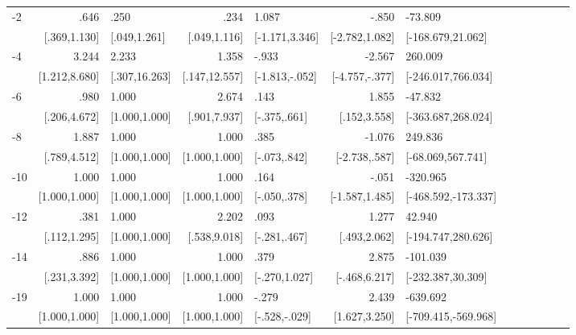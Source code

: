 \begin{table}[h]
\begin{adjustbox}{max width=\linewidth}
\begin{threeparttable}
{\begin{tabular}{l*{6}{D{.}{.}{-1}l}}
-2             &            .646&            .250&            .234&           1.087&           -.850&         -73.809\\
                &    [.369,1.130]&    [.049,1.261]&    [.049,1.116]&  [-1.171,3.346]&  [-2.782,1.082]&[-168.679,21.062]\\
-4             &           3.244&           2.233&           1.358&           -.933&          -2.567&         260.009\\
                &   [1.212,8.680]&   [.307,16.263]&   [.147,12.557]&  [-1.813,-.052]&  [-4.757,-.377]&[-246.017,766.034]\\
-6             &            .980&           1.000&           2.674&            .143&           1.855&         -47.832\\
                &    [.206,4.672]&   [1.000,1.000]&    [.901,7.937]&    [-.375,.661]&    [.152,3.558]&[-363.687,268.024]\\
-8             &           1.887&           1.000&           1.000&            .385&          -1.076&         249.836\\
                &    [.789,4.512]&   [1.000,1.000]&   [1.000,1.000]&    [-.073,.842]&   [-2.738,.587]&[-68.069,567.741]\\
-10            &           1.000&           1.000&           1.000&            .164&           -.051&        -320.965\\
                &   [1.000,1.000]&   [1.000,1.000]&   [1.000,1.000]&    [-.050,.378]&  [-1.587,1.485]&[-468.592,-173.337]\\
-12           &            .381&           1.000&           2.202&            .093&           1.277&          42.940\\
                &    [.112,1.295]&   [1.000,1.000]&    [.538,9.018]&    [-.281,.467]&    [.493,2.062]&[-194.747,280.626]\\
-14           &            .886&           1.000&           1.000&            .379&           2.875&        -101.039\\
                &    [.231,3.392]&   [1.000,1.000]&   [1.000,1.000]&   [-.270,1.027]&   [-.468,6.217]&[-232.387,30.309]\\
-19           &           1.000&           1.000&           1.000&           -.279&           2.439&        -639.692\\
                &   [1.000,1.000]&   [1.000,1.000]&   [1.000,1.000]&   [-.528,-.029]&   [1.627,3.250]&[-709.415,-569.968]\\

\end{tabular}}
\end{threeparttable}
\end{adjustbox}
\end{table}
